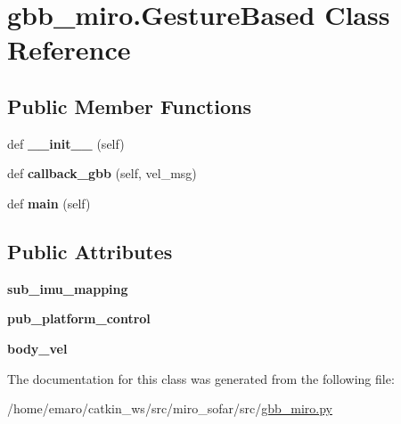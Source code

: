 \hypertarget{classgbb__miro_1_1GestureBased}{}\section{gbb\+\_\+miro.\+Gesture\+Based Class Reference}
\label{classgbb__miro_1_1GestureBased}
\subsection*{Public Member Functions}
\begin{DoxyCompactItemize}
\item 
\mbox{\label{classgbb__miro_1_1GestureBased_a07f79eb00b603ad746d6207e90cb7a7c}} 
def {\bfseries \+\_\+\+\_\+init\+\_\+\+\_\+} (self)
\item 
\mbox{\label{classgbb__miro_1_1GestureBased_a8e1b7b744c86c469224b221ba048c1eb}} 
def {\bfseries callback\+\_\+gbb} (self, vel\+\_\+msg)
\item 
\mbox{\label{classgbb__miro_1_1GestureBased_a47f54767f7a09c1e316bfe935c553eb5}} 
def {\bfseries main} (self)
\end{DoxyCompactItemize}
\subsection*{Public Attributes}
\begin{DoxyCompactItemize}
\item 
\mbox{\label{classgbb__miro_1_1GestureBased_a7dcbe92c3a3f519aadb2100611307a4b}} 
{\bfseries sub\+\_\+imu\+\_\+mapping}
\item 
\mbox{\label{classgbb__miro_1_1GestureBased_a55c8badeade411056ded86b61cc10062}} 
{\bfseries pub\+\_\+platform\+\_\+control}
\item 
\mbox{\label{classgbb__miro_1_1GestureBased_a843b6c194d6a1eaf1ebd1b64a9640029}} 
{\bfseries body\+\_\+vel}
\end{DoxyCompactItemize}


The documentation for this class was generated from the following file\+:\begin{DoxyCompactItemize}
\item 
/home/emaro/catkin\+\_\+ws/src/miro\+\_\+sofar/src/\mbox{\hyperlink{gbb__miro_8py}{gbb\+\_\+miro.\+py}}\end{DoxyCompactItemize}
